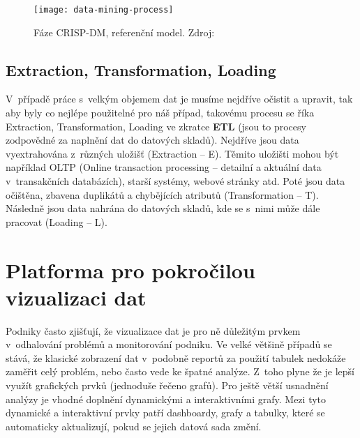 \begin{figure}[!htp]
\centering
\texttt{[image: data-mining-process]}
\caption[Fáze CRISP-DM, referenční model]{Fáze CRISP-DM, referenční model. Zdroj: \cite{data-mining-practical}}
\label{crisp-dm}
\end{figure}

\subsection{Extraction, Transformation, Loading}
\par V~případě práce s~velkým objemem dat je musíme nejdříve očistit a upravit, tak aby byly co nejlépe použitelné pro náš případ, takovému procesu se říka Extraction, Transformation, Loading ve zkratce \textbf{ETL} (jsou to procesy zodpovědné za naplnění dat do datových skladů). Nejdříve jsou data vyextrahována z~různých uložišť (Extraction -- E). Těmito uložišti mohou být například OLTP (Online transaction processing -- detailní a aktuální data v~transakčních databázích), starší systémy, webové stránky atd. Poté jsou data očištěna, zbavena duplikátů a chybějících atributů  (Transformation -- T). Následně jsou data nahrána do datových skladů, kde se s~nimi může dále pracovat (Loading -- L).


\section{Platforma pro pokročilou vizualizaci dat}
\par Podniky často zjišťují, že vizualizace dat je pro ně důležitým prvkem v~odhalování problémů a monitorování podniku. Ve velké většině případů se stává, že klasické zobrazení dat v~podobně reportů za použití tabulek nedokáže zaměřit celý problém, nebo často vede ke špatné analýze. Z~toho plyne že je lepší využít grafických prvků (jednoduše řečeno grafů). Pro ještě větší usnadnění analýzy je vhodné doplnění dynamickými a interaktivními grafy. Mezi tyto dynamické a interaktivní prvky patří dashboardy, grafy a tabulky, které se automaticky aktualizují, pokud se jejich datová sada změní.

